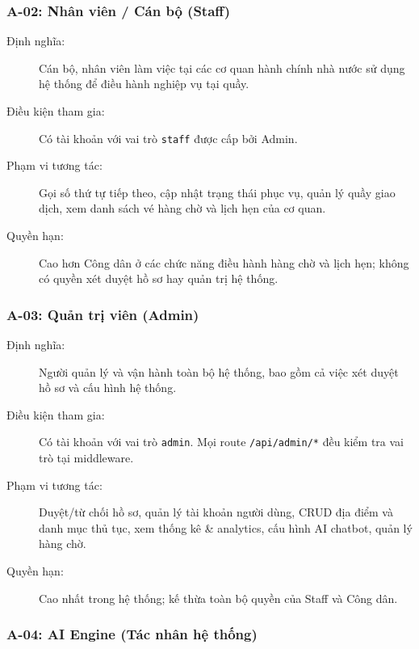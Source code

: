 \subsubsection{A-02: Nhân viên / Cán bộ (Staff)}

\begin{description}
  \item[Định nghĩa:] Cán bộ, nhân viên làm việc tại các cơ quan
    hành chính nhà nước sử dụng hệ thống để điều hành nghiệp vụ tại quầy.
  \item[Điều kiện tham gia:] Có tài khoản với vai trò \texttt{staff}
    được cấp bởi Admin.
  \item[Phạm vi tương tác:] Gọi số thứ tự tiếp theo, cập nhật trạng thái
    phục vụ, quản lý quầy giao dịch, xem danh sách vé hàng chờ
    và lịch hẹn của cơ quan.
  \item[Quyền hạn:] Cao hơn Công dân ở các chức năng điều hành hàng chờ
    và lịch hẹn; không có quyền xét duyệt hồ sơ hay quản trị hệ thống.
\end{description}

\subsubsection{A-03: Quản trị viên (Admin)}

\begin{description}
  \item[Định nghĩa:] Người quản lý và vận hành toàn bộ hệ thống,
    bao gồm cả việc xét duyệt hồ sơ và cấu hình hệ thống.
  \item[Điều kiện tham gia:] Có tài khoản với vai trò \texttt{admin}.
    Mọi route \texttt{/api/admin/*} đều kiểm tra vai trò tại middleware.
  \item[Phạm vi tương tác:] Duyệt/từ chối hồ sơ, quản lý tài khoản
    người dùng, CRUD địa điểm và danh mục thủ tục, xem thống kê
    \& analytics, cấu hình AI chatbot, quản lý hàng chờ.
  \item[Quyền hạn:] Cao nhất trong hệ thống; kế thừa toàn bộ
    quyền của Staff và Công dân.
\end{description}

\subsubsection{A-04: AI Engine (Tác nhân hệ thống)}

